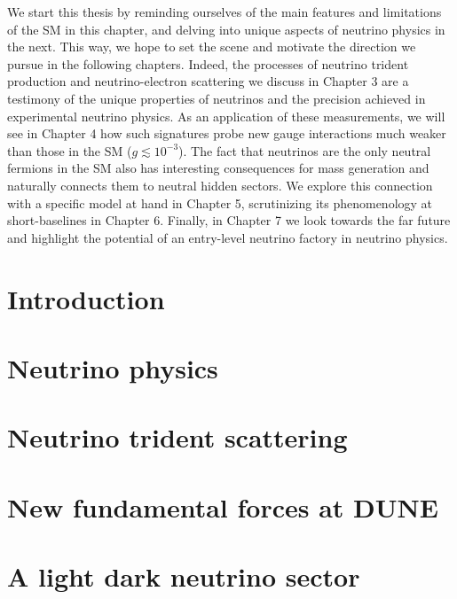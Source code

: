 \documentclass[openany,twoside,frontopenright,chaprunninghead]{ip3thesis}
\begin{document}
We start this thesis by reminding ourselves of the main features and limitations of the SM in this chapter, and delving into unique aspects of neutrino physics in the next. This way, we hope to set the scene and motivate the direction we pursue in the following chapters. Indeed, the processes of neutrino trident production and neutrino-electron scattering we discuss in Chapter 3 are a testimony of the unique properties of neutrinos and the precision achieved in experimental neutrino physics. As an application of these measurements, we will see in Chapter 4 how such signatures probe new gauge interactions much weaker than those in the SM ($g \lesssim 10^{-3}$). The fact that neutrinos are the only neutral fermions in the SM also has interesting consequences for mass generation and naturally connects them to neutral hidden sectors. We explore this connection with a specific model at hand in Chapter 5, scrutinizing its phenomenology at short-baselines in Chapter 6. Finally, in Chapter 7 we look towards the far future and highlight the potential of an entry-level neutrino factory in neutrino physics.

\chapter{Introduction}


\chapter{Neutrino physics}
% 


\chapter{Neutrino trident scattering}


\chapter{New fundamental forces at DUNE}


\chapter{A light dark neutrino sector}

\end{document}
